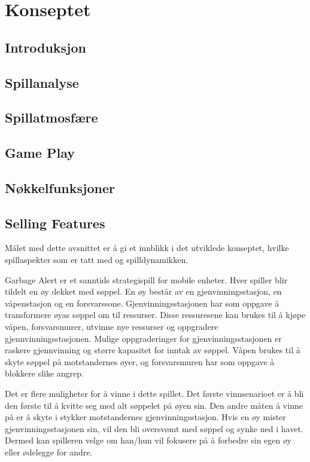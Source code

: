 \section{Konseptet}\label{sec:konsept}

\subsection{Introduksjon}
\subsection{Spillanalyse}
\subsection{Spillatmosfære}
\subsection{Game Play}
\subsection{Nøkkelfunksjoner}
\subsection{Selling Features}

Målet med dette avsnittet er å gi et innblikk i det utviklede konseptet,
hvilke spillaspekter som er tatt med og spilldynamikken.

Garbage Alert er et sanntids strategispill for mobile enheter. Hver
spiller blir tildelt en øy dekket med søppel. En øy består av en
gjenvinningsstasjon, en våpenstasjon og en forsvarssone.
Gjenvinningsstasjonen har som oppgave å transformere øyas søppel om til
ressurser. Disse ressuresene kan brukes til å kjøpe våpen,
forsvarsmurer, utvinne nye ressurser og oppgradere
gjennvinningsstasjonen. Mulige oppgraderinger for gjenvinningsstasjonen
er raskere gjennvinning og større kapasitet for inntak av søppel. Våpen
brukes til å skyte søppel på motstandernes øyer, og forsvarsmuren har
som oppgave å blokkere slike angrep. 

Det er flere muligheter for å vinne i dette spillet. Det første
vinnsenarioet er å bli den første til å kvitte seg med alt søppelet på
øyen sin. Den andre måten å vinne på er å skyte i stykker motstandernes
gjenvinningsstasjon. Hvis en øy mister gjenvinningsstasjonen sin, vil
den bli oversvømt med søppel og synke ned i havet. Dermed kan spilleren
velge om han/hun vil fokusere på å forbedre sin egen øy eller ødelegge
for andre. 

